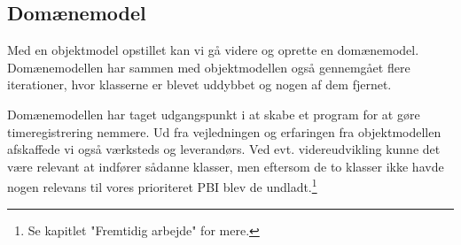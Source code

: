 \subsection{Domænemodel}

Med en objektmodel opstillet kan vi gå videre og oprette en domænemodel. Domænemodellen har sammen med objektmodellen også gennemgået flere iterationer, hvor klasserne er blevet uddybbet og nogen af dem fjernet. 

Domænemodellen har taget udgangspunkt i at skabe et program for at gøre timeregistrering nemmere. Ud fra vejledningen og erfaringen fra objektmodellen afskaffede vi også værksteds og leverandørs. Ved evt. videreudvikling kunne det være relevant at indfører sådanne klasser, men eftersom de to klasser ikke havde nogen relevans til vores prioriteret PBI blev de undladt.\footnote{Se kapitlet "Fremtidig arbejde" for mere.}